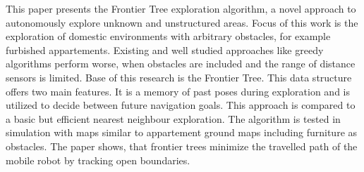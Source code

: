 This paper presents the Frontier Tree exploration algorithm, a novel approach to autonomously explore unknown and unstructured areas. Focus of this work is the exploration of domestic environments with arbitrary obstacles, for example furbished appartements. Existing and well studied approaches like greedy algorithms perform worse, when obstacles are included and the range of distance sensors is limited. Base of this research is the Frontier Tree. This data structure offers two main features. It is a memory of past poses during exploration and is utilized to decide between future navigation goals. This approach is compared to a basic but efficient nearest neighbour exploration. The algorithm is tested in simulation with maps similar to appartement ground maps including furniture as obstacles. The paper shows, that frontier trees minimize the travelled path of the mobile robot by tracking open boundaries.
